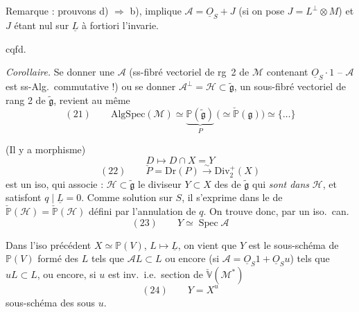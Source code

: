 \documentclass[11pt,a4paper]{article}
\begin{document}
Remarque : prouvons d) $\Rightarrow$ b),  \ill{} implique
$\mathcal{A} = \underline{O}_S + J$ (si on pose $J = L^{\perp} \otimes M$)
et $J$ étant nul sur $\underline{L}$ à fortiori l'invarie.

cqfd.

\emph{Corollaire.} Se donner une $\mathcal{A}$ (ss-fibré vectoriel de rg~2 de
$\mathcal{M}$ contenant  $\underline{O}_S \cdot 1$ -- 
 $\mathcal{A}$ est  ss-Alg.\ commutative !) ou se donner
$\mathcal{A}^{\perp} = \mathcal{H} \subset \widetilde{\mathfrak{g}}$, un sous-fibré
vectoriel de rang 2  de $\widetilde{\mathfrak{g}}$, revient au
même
\[
  (21) \qquad \mathrm{AlgSpec}(\mathcal{M}) \simeq \underbrace{\mathbb{P}(\widetilde{\mathfrak{g}})}_{P} \ \bigl(\simeq \check{\mathbb{P}}(\mathfrak{g})\bigr) \simeq \lbrace \ldots \rbrace
\]

(Il y a   morphisme)
\[
  D \longmapsto D \cap X = Y
\]
\[
  (22) \qquad \check{P} = \mathrm{Dr}(P) \xrightarrow{\ \sim\ } \mathrm{Div}_2^{+}(X)
\]
est un iso, qui associe : \struck{\ill{}}  $\mathcal{H} \subset \widetilde{\mathfrak{g}}$
le diviseur $Y \subset X$ des   de
$\widetilde{\mathfrak{g}}$ qui \emph{sont dans} $\mathcal{H}$, et satisfont
$q \mid \underline{L} = 0$.
 Comme solution sur $S$, il s'exprime dans le
 de $\check{\mathbb{P}}(\mathcal{H}) = \check{\mathbb{P}}(\mathcal{H})$ défini par
l'annulation de $q$. On trouve donc, \struck{\ill{}} par \ill{} un iso.\ can.
\[
  (23) \qquad Y \simeq \operatorname{Spec} \mathcal{A}
\]

Dans l'iso précédent $X \simeq \mathbb{P}(V)$,  $L \mapsto \underline{L}$,
on vient que $Y$ est le sous-schéma de $\mathbb{P}(V)$ formé des $L$ tels que
$\mathcal{A} L \subset L$ ou encore (si $\mathcal{A} = \underline{O}_S 1 + \underline{O}_S u$)
tels que $u L \subset L$, ou encore, si $u$ est inv.\ i.e.\ section de
$\check{\mathbb{V}}(\mathcal{M}^{*})$
\[
  (24) \qquad Y = X^{u}
\]
sous-schéma des  sous $u$.
\end{document}

